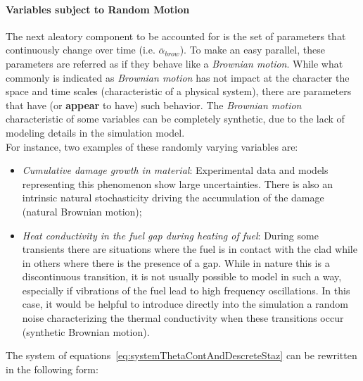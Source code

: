 \paragraph{Variables subject to Random Motion}
The next aleatory component to be accounted for is the set of parameters that continuously change over time (i.e. $\overline{\alpha}_{brow}$). 
To make an easy parallel,  these parameters are referred as if they behave like a \textit{Brownian motion}. 
While what commonly is indicated as \textit{Brownian motion} has not impact at the character
the space and time scales (characteristic of a physical system), there are parameters that have (or \textbf{appear} 
to have) such behavior. The  \textit{Brownian motion} characteristic of some variables can be completely 
synthetic, due to the lack of modeling details in the simulation model.
\\For instance, two examples of these randomly varying variables are:
\begin{itemize}
  \item \textit{Cumulative damage growth in material}: Experimental data and models representing this
  phenomenon show large uncertainties. There is also an intrinsic natural stochasticity driving
  the accumulation of the damage (natural Brownian motion);
  \item \textit{Heat conductivity in the fuel gap during heating of fuel}: During some transients there are
  situations where the fuel is in contact with the clad while in others where there is the presence of a gap. While in   
  nature this is a discontinuous transition, it is not usually possible to model in such a way, especially if vibrations 
  of the fuel lead to high frequency oscillations. In this case, it would be helpful to introduce directly into the 
  simulation a random noise characterizing the thermal conductivity when these transitions occur (synthetic 
  Brownian motion).
\end{itemize}
The system of equations~\ref{eq:systemThetaContAndDescreteStaz} can be rewritten in the following form:

